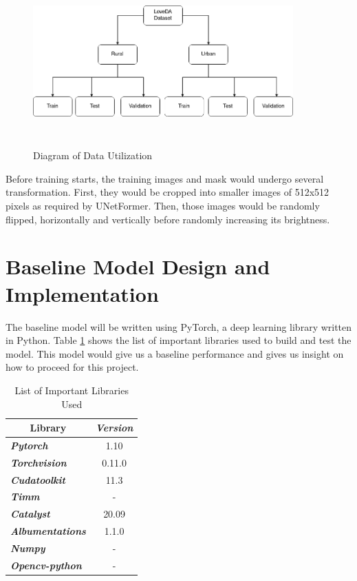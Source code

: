 \FloatBarrier
\begin{figure}[!h]
\includegraphics[width=10.0cm, height=6.5cm]{images/loveda-chart.png}
\centering
\caption{Diagram of Data Utilization}
\label{fig:data-uti}
\end{figure}
\FloatBarrier

Before training starts, the training images and mask would undergo several transformation. First, they would be cropped into smaller images of 512x512 pixels as required by UNetFormer. Then, those images would be randomly flipped, horizontally and vertically before randomly increasing its brightness.



\section{Baseline Model Design and Implementation}

The baseline model will be written using PyTorch, a deep learning library written in Python. Table \ref{tab:libraries} shows the list of important libraries used to build and test the model. This model would give us a baseline performance and gives us insight on how to proceed for this project.

\begin{table}[]
\centering
\begin{tabular}{|l|c|}
\hline
\multicolumn{1}{|c|}{\textbf{Library}} & \textit{\textbf{Version}} \\ \hline
\textit{\textbf{Pytorch}}              & 1.10                      \\ \hline
\textit{\textbf{Torchvision}}          & 0.11.0                    \\ \hline
\textit{\textbf{Cudatoolkit}}          & 11.3                      \\ \hline
\textit{\textbf{Timm}}                 & -                         \\ \hline
\textit{\textbf{Catalyst}}             & 20.09                     \\ \hline
\textit{\textbf{Albumentations}}       & 1.1.0                     \\ \hline
\textit{\textbf{Numpy}}                & -                         \\ \hline
\textit{\textbf{Opencv-python}}       & -                         \\ \hline
\end{tabular}
\caption{List of Important Libraries Used}
\label{tab:libraries}
\end{table}

